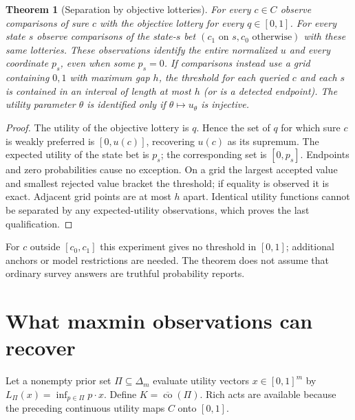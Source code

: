 \documentclass[11pt]{article}
\newtheorem{theorem}{Theorem}
\theoremstyle{remark}
\begin{document}
\begin{theorem}[Separation by objective lotteries]
For every $c\in C$ observe comparisons of sure $c$ with the objective
lottery for every $q\in[0,1]$. For every state $s$ observe comparisons of
the state-$s$ bet $(c_1\text{ on }s,c_0\text{ otherwise})$ with these same
lotteries. These observations identify the entire normalized $u$ and
every coordinate $p_s$, even when some $p_s=0$.
If comparisons instead use a grid containing $0,1$ with maximum gap
$h$, the threshold for each queried $c$ and each $s$ is contained in an
interval of length at most $h$ (or is a detected endpoint).
The utility parameter $\theta$ is identified only if
$\theta\mapsto u_\theta$ is injective.
\end{theorem}
\begin{proof}
The utility of the objective lottery is $q$. Hence the set of $q$ for which
sure $c$ is weakly preferred is $[0,u(c)]$, recovering $u(c)$ as its
supremum. The expected utility of the state bet is $p_s$; the corresponding
set is $[0,p_s]$. Endpoints and zero probabilities cause no exception.
On a grid the largest accepted value and smallest rejected value bracket
the threshold; if equality is observed it is exact. Adjacent grid points
are at most $h$ apart. Identical utility functions cannot be separated by
any expected-utility observations, which proves the last qualification.
\end{proof}

For $c$ outside $[c_0,c_1]$ this experiment gives no threshold in $[0,1]$;
additional anchors or model restrictions are needed. The theorem does not
assume that ordinary survey answers are truthful probability reports.

\section{What maxmin observations can recover}
Let a nonempty prior set $\Pi\subseteq\Delta_m$ evaluate utility vectors
$x\in[0,1]^m$ by $L_\Pi(x)=\inf_{p\in\Pi}p\cdot x$. Define
$K=\overline{\operatorname{co}}(\Pi)$. Rich acts are available because
the preceding continuous utility maps $C$ onto $[0,1]$.
\end{document}
